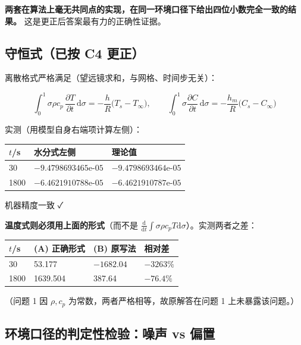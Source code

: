 \textbf{两套在算法上毫无共同点的实现，在同一环境口径下给出四位小数完全一致的结果。} 这是更正后答案最有力的正确性证据。


\subsection{守恒式（已按 C4 更正）}


离散格式严格满足（望远镜求和，与网格、时间步无关）：


\begin{equation*}
\int_0^1\!\sigma\rho c_p\,\frac{\partial T}{\partial t}\,\mathrm d\sigma=-\frac hR\big(T_s-T_\infty\big),\qquad
\int_0^1\!\sigma\frac{\partial C}{\partial t}\,\mathrm d\sigma=-\frac{h_m}R\big(C_s-C_\infty\big)
\end{equation*}


实测（用模型自身右端项计算左侧）：


\begin{center}
\small
\begin{tabular}{lll}
\toprule
$t$/s & 水分式左侧 & 理论值 \\
\midrule
30 & $-9.4798693465\text{e-}05$ & $-9.4798693464\text{e-}05$ \\
1800 & $-6.4621910788\text{e-}05$ & $-6.4621910787\text{e-}05$ \\
\bottomrule
\end{tabular}
\end{center}


机器精度一致 ✓


\textbf{温度式则必须用上面的形式}（而不是 $\frac{\mathrm d}{\mathrm dt}\int\sigma\rho c_pT\mathrm d\sigma$）。实测两者之差：


\begin{center}
\small
\begin{tabular}{llll}
\toprule
$t$/s & (A) 正确形式 & (B) 原写法 & 相对差 \\
\midrule
30 & 53.177 & $-1682.04$ & $-3263\%$ \\
1800 & 1639.504 & 387.64 & $-76.4\%$ \\
\bottomrule
\end{tabular}
\end{center}


（问题 1 因 $\rho,c_p$ 为常数，两者严格相等，故原解答在问题 1 上未暴露该问题。）


\subsection{环境口径的\textbf{判定性检验}：噪声 vs 偏置}


